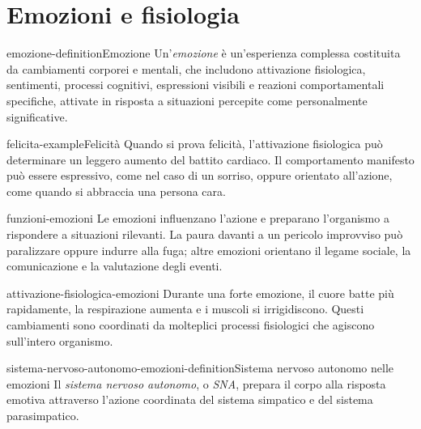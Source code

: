 \documentclass[preview]{standalone}
\begin{document}
\genpage

\section{Emozioni e fisiologia}

\begin{snippetdefinition}{emozione-definition}{Emozione}
    Un'\emph{emozione} è un'esperienza complessa costituita da cambiamenti
    corporei e mentali, che includono attivazione fisiologica, sentimenti,
    processi cognitivi, espressioni visibili e reazioni comportamentali
    specifiche, attivate in risposta a situazioni percepite come personalmente
    significative.
\end{snippetdefinition}

\begin{snippetexample}{felicita-example}{Felicità}
    Quando si prova felicità, l'attivazione fisiologica può determinare un
    leggero aumento del battito cardiaco. Il comportamento manifesto può essere
    espressivo, come nel caso di un sorriso, oppure orientato all'azione, come
    quando si abbraccia una persona cara.
\end{snippetexample}

\begin{snippet}{funzioni-emozioni}
    Le emozioni influenzano l'azione e preparano l'organismo a rispondere a
    situazioni rilevanti. La paura davanti a un pericolo improvviso può
    paralizzare oppure indurre alla fuga; altre emozioni orientano il legame
    sociale, la comunicazione e la valutazione degli eventi.
\end{snippet}

\begin{snippet}{attivazione-fisiologica-emozioni}
    Durante una forte emozione, il cuore batte più rapidamente, la respirazione
    aumenta e i muscoli si irrigidiscono. Questi cambiamenti sono coordinati da
    molteplici processi fisiologici che agiscono sull'intero organismo.
\end{snippet}

\begin{snippetdefinition}{sistema-nervoso-autonomo-emozioni-definition}{Sistema nervoso autonomo nelle emozioni}
    Il \emph{sistema nervoso autonomo}, o \emph{SNA}, prepara il corpo alla
    risposta emotiva attraverso l'azione coordinata del sistema simpatico e del
    sistema parasimpatico.
\end{snippetdefinition}
\end{document}

